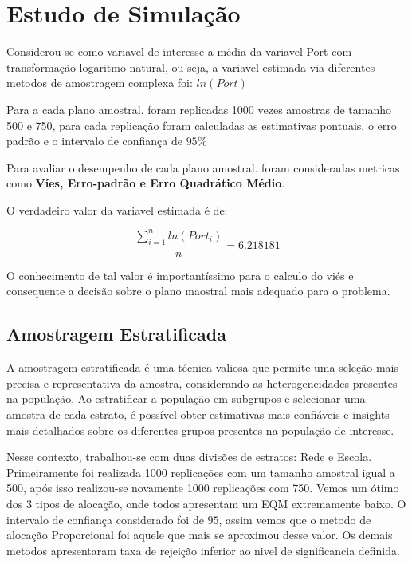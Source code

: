 \documentclass[sn-basic,pdflatex]{sn-jnl}
\theoremstyle{remark}
\theoremstyle{definition}
\begin{document}
\hypertarget{estudo-de-simulauxe7uxe3o}{%
\section{Estudo de Simulação}\label{estudo-de-simulauxe7uxe3o}}

Considerou-se como variavel de interesse a média da variavel Port com
transformação logaritmo natural, ou seja, a variavel estimada via
diferentes metodos de amostragem complexa foi: \(ln({Port})\)

Para a cada plano amostral, foram replicadas 1000 vezes amostras de
tamanho 500 e 750, para cada replicação foram calculadas as estimativas
pontuais, o erro padrão e o intervalo de confiança de \(95\%\)

Para avaliar o desempenho de cada plano amostral. foram consideradas
metricas como \textbf{Víes, Erro-padrão e Erro Quadrático Médio}.

O verdadeiro valor da variavel estimada é de:

\[
\frac{\sum_{i=1}^n{ln(Port_i)}}{n} = 6.218181
\]

O conhecimento de tal valor é importantíssimo para o calculo do viés e
consequente a decisão sobre o plano maostral mais adequado para o
problema.

\hypertarget{amostragem-estratificada}{%
\subsection{Amostragem Estratificada}\label{amostragem-estratificada}}

A amostragem estratificada é uma técnica valiosa que permite uma seleção
mais precisa e representativa da amostra, considerando as
heterogeneidades presentes na população. Ao estratificar a população em
subgrupos e selecionar uma amostra de cada estrato, é possível obter
estimativas mais confiáveis e insights mais detalhados sobre os
diferentes grupos presentes na população de interesse.

Nesse contexto, trabalhou-se com duas divisões de estratos: Rede e
Escola. Primeiramente foi realizada 1000 replicações com um tamanho
amostral igual a 500, após isso realizou-se novamente 1000 replicações
com 750. Vemos um ótimo dos 3 tipos de alocação, onde todos apresentam
um EQM extremamente baixo. O intervalo de confiança considerado foi de
\(95%
\), assim vemos que o metodo de alocação Proporcional foi aquele que
mais se aproximou desse valor. Os demais metodos apresentaram taxa de
rejeição inferior ao nivel de significancia definida.
\end{document}
